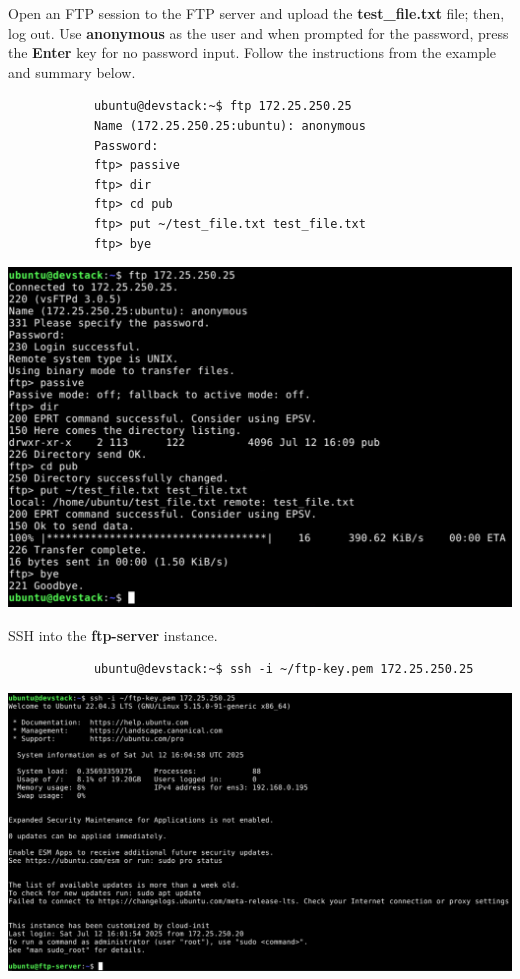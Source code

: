 \documentclass[letterpaper, 12pt]{article}
\begin{document}
\begin{enumerate}
    \begin{labstep}
        Open an FTP session to the FTP server and upload the \textbf{test\_file.txt} file; then, log out.
        Use \textbf{anonymous} as the user and when prompted for the password, press the \textbf{Enter} key for no password input.
        Follow the instructions from the example and summary below.
        \begin{lstlisting}
            ubuntu@devstack:~$ ftp 172.25.250.25
            Name (172.25.250.25:ubuntu): anonymous
            Password:
            ftp> passive
            ftp> dir
            ftp> cd pub
            ftp> put ~/test_file.txt test_file.txt
            ftp> bye
        \end{lstlisting}

        \begin{center}
            \includegraphics[width=\linewidth]{images/part2/step19.png}
        \end{center}
    \end{labstep}

    \begin{labstep}
        SSH into the \textbf{ftp-server} instance.
        \begin{lstlisting}
            ubuntu@devstack:~$ ssh -i ~/ftp-key.pem 172.25.250.25
        \end{lstlisting}

        \begin{center}
            \includegraphics[width=\linewidth]{images/part2/step20.png}
        \end{center}
    \end{labstep}


\end{enumerate}
\end{document}
